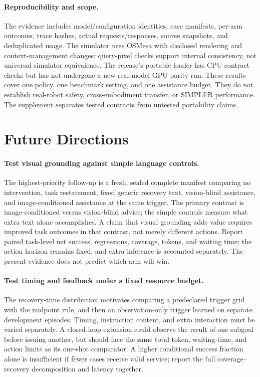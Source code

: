 \documentclass[10pt,twocolumn,letterpaper]{article}
\begin{document}
\paragraph{Reproducibility and scope.}
The evidence includes model/configuration identities, case manifests, per-arm outcomes, trace hashes, actual requests/responses, source snapshots, and deduplicated usage. The simulator uses OSMesa with disclosed rendering and context-management changes; query-pixel checks support internal consistency, not universal simulator equivalence. The release's portable loader has CPU contract checks but has not undergone a new real-model GPU parity run. These results cover one policy, one benchmark setting, and one assistance budget. They do not establish real-robot safety, cross-embodiment transfer, or SIMPLER performance. The supplement separates tested contracts from untested portability claims.

\section{Future Directions}
\label{sec:future}
\paragraph{Test visual grounding against simple language controls.}
The highest-priority follow-up is a fresh, sealed complete manifest comparing no intervention, task restatement, fixed generic recovery text, vision-blind assistance, and image-conditioned assistance at the same trigger. The primary contrast is image-conditioned versus vision-blind advice; the simple controls measure what extra text alone accomplishes. A claim that visual grounding adds value requires improved task outcomes in that contrast, not merely different actions. Report paired task-level net success, regressions, coverage, tokens, and waiting time; the action horizon remains fixed, and extra inference is accounted separately. The present evidence does not predict which arm will win.

\paragraph{Test timing and feedback under a fixed resource budget.}
The recovery-time distribution motivates comparing a predeclared trigger grid with the midpoint rule, and then an observation-only trigger learned on separate development episodes. Timing, instruction content, and extra interaction must be varied separately. A closed-loop extension could observe the result of one subgoal before issuing another, but should face the same total token, waiting-time, and action limits as its one-shot comparator. A higher conditional success fraction alone is insufficient if fewer cases receive valid service; report the full coverage--recovery decomposition and latency together.
\end{document}
